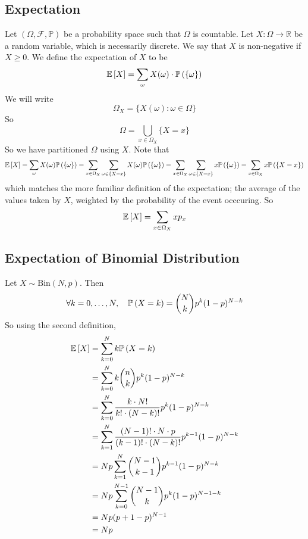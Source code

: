 \subsection{Expectation}
Let \((\Omega, \mathcal F, \mathbb P)\) be a probability space such that \(\Omega\) is countable.
Let \(X \colon \Omega \to \mathbb R\) be a random variable, which is necessarily discrete.
We say that \(X\) is non-negative if \(X \geq 0\).
We define the expectation of \(X\) to be
\[
	\mathbb{E}\left[{X}\right] = \sum_\omega X(\omega) \cdot \mathbb{P}\left({\{ \omega \}}\right)
\]
We will write
\[
	\Omega_X = \{ X(\omega) \colon \omega \in \Omega \}
\]
So
\[
	\Omega = \bigcup_{x \in \Omega_X} \{ X = x \}
\]
So we have partitioned \(\Omega\) using \(X\).
Note that
\[
	\mathbb{E}\left[{X}\right] = \sum_\omega X(\omega) \mathbb{P}\left({\{\omega\}}\right) = \sum_{x \in \Omega_X} \sum_{\omega \in \{ X = x\}} X(\omega) \mathbb{P}\left({\{\omega\}}\right) = \sum_{x \in \Omega_X} \sum_{\omega \in \{ X = x\}} x \mathbb{P}\left({\{\omega\}}\right) = \sum_{x \in \Omega_X} x\mathbb{P}\left({\{X = x \}}\right)
\]
which matches the more familiar definition of the expectation; the average of the values taken by \(X\), weighted by the probability of the event occcuring.
So
\[
	\mathbb{E}\left[{X}\right] = \sum_{x \in \Omega_X} x p_x
\]

\subsection{Expectation of Binomial Distribution}
Let \(X \sim \mathrm{Bin}(N, p)\).
Then
\[
	\forall k = 0, \dots, N,\quad \mathbb{P}\left({X = k}\right) = \binom{N}{k} p^k (1-p)^{N-k}
\]
So using the second definition,
\begin{align*}
	\mathbb{E}\left[{X}\right] & = \sum_{k=0}^N k \mathbb{P}\left({X = k}\right)                            \\
	           & = \sum_{k=0}^N k \binom{n}{k} p^k (1-p)^{N-k}            \\
	           & = \sum_{k=0}^N \frac{k \cdot N!}{k!
	\cdot (N-k)!} p^k (1-p)^{N-k}                                         \\
	           & = \sum_{k=1}^N \frac{(N-1)!
		\cdot N \cdot p}{(k-1)!
	\cdot (N-k)!} p^{k-1} (1-p)^{N-k}                                     \\
	           & = Np \sum_{k=1}^N \binom{N-1}{k-1} p^{k-1} (1-p)^{N-k}   \\
	           & = Np \sum_{k=0}^{N-1} \binom{N-1}{k} p^{k} (1-p)^{N-1-k} \\
	           & = Np (p + 1 - p)^{N-1}                                   \\
	           & = Np
\end{align*}


